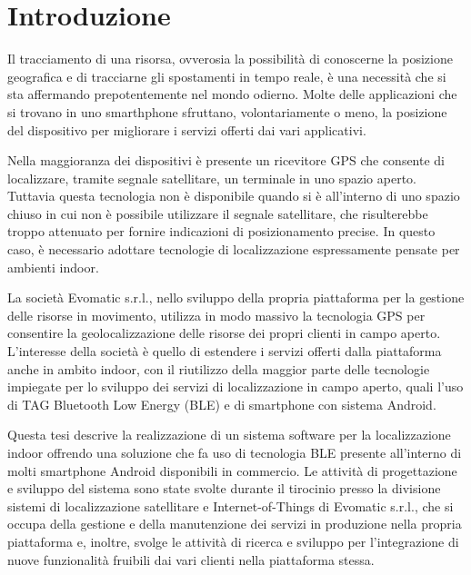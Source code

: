 
\cleardoublepage
{}

\chapter*{Introduzione}

Il tracciamento di una risorsa, ovverosia la possibilità di conoscerne la posizione geografica e di tracciarne gli spostamenti in tempo reale, è una necessità che si sta affermando prepotentemente nel mondo odierno. Molte delle applicazioni che si trovano in uno smarthphone sfruttano, volontariamente o meno, la posizione del dispositivo per migliorare i servizi offerti dai vari applicativi.

Nella maggioranza dei dispositivi è presente un ricevitore GPS che consente di localizzare, tramite segnale satellitare, un terminale in uno spazio aperto. Tuttavia questa tecnologia non è disponibile quando si è all'interno di uno spazio chiuso in cui non è possibile utilizzare il segnale satellitare, che risulterebbe troppo attenuato per fornire indicazioni di posizionamento precise. In questo caso, è necessario adottare tecnologie di localizzazione espressamente pensate per ambienti indoor.

La società Evomatic s.r.l., nello sviluppo della propria piattaforma per la gestione delle risorse in movimento, utilizza in modo massivo la tecnologia GPS per consentire la geolocalizzazione delle risorse dei propri clienti in campo aperto. L'interesse della società è quello di estendere i servizi offerti dalla piattaforma anche in ambito indoor, con il riutilizzo della maggior parte delle tecnologie impiegate per lo sviluppo dei servizi di localizzazione in campo aperto, quali l'uso di TAG Bluetooth Low Energy (BLE) e di smartphone con sistema Android.

Questa tesi descrive la realizzazione di un sistema software per la localizzazione indoor offrendo una soluzione che fa uso di tecnologia BLE presente all'interno di molti smartphone Android disponibili in commercio. Le attività di progettazione e sviluppo del sistema sono state svolte durante il tirocinio presso la divisione sistemi di localizzazione satellitare e Internet-of-Things di Evomatic s.r.l., che si occupa della gestione e della manutenzione dei servizi in produzione nella propria piattaforma e, inoltre, svolge le attività di ricerca e sviluppo per l’integrazione di nuove funzionalità fruibili dai vari clienti nella piattaforma stessa.

